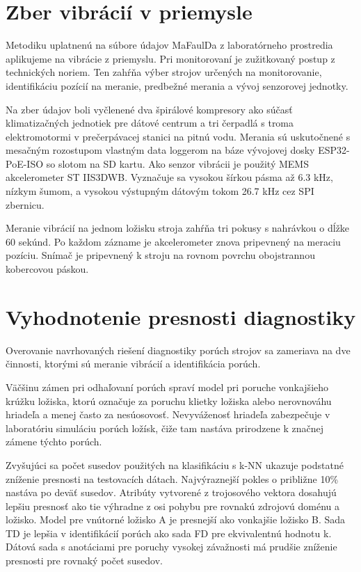 \section{Zber vibrácií v priemysle}
Metodiku uplatnenú na súbore údajov MaFaulDa z laboratórneho prostredia aplikujeme na vibrácie z priemyslu. Pri monitorovaní je zužitkovaný postup z technických noriem. Ten zahŕňa výber strojov určených na monitorovanie, identifikáciu pozícií na meranie, predbežné merania a vývoj senzorovej jednotky. 

Na zber údajov boli vyčlenené dva špirálové kompresory ako súčasť klimatizačných jednotiek pre dátové centrum a tri čerpadlá s troma elektromotormi v prečerpávacej stanici na pitnú vodu. Merania sú uskutočnené s mesačným rozostupom vlastným data loggerom na báze vývojovej dosky ESP32-PoE-ISO so slotom na SD kartu. Ako senzor vibrácii je použitý MEMS akcelerometer ST IIS3DWB. Vyznačuje sa vysokou šírkou pásma až 6.3 kHz, nízkym šumom, a vysokou výstupným dátovým tokom 26.7 kHz cez SPI zbernicu. 

Meranie vibrácií na jednom ložisku stroja zahŕňa tri pokusy s nahrávkou o dĺžke 60 sekúnd. Po každom zázname je akcelerometer znova pripevnený na meraciu pozíciu. Snímač je pripevnený k stroju na rovnom povrchu obojstrannou kobercovou páskou.

\section{Vyhodnotenie presnosti diagnostiky}
Overovanie navrhovaných riešení diagnostiky porúch strojov sa zameriava na dve činnosti, ktorými sú meranie vibrácií a identifikácia porúch.

Väčšinu zámen pri odhaľovaní porúch spraví model pri poruche vonkajšieho krúžku ložiska, ktorú označuje za poruchu klietky ložiska alebo nerovnováhu hriadeľa a menej často za nesúosovosť. Nevyváženosť hriadeľa zabezpečuje v laboratóriu simuláciu porúch ložísk, čiže tam nastáva prirodzene k značnej zámene týchto porúch.

Zvyšujúci sa počet susedov použitých na klasifikáciu s k-NN ukazuje podstatné zníženie presnosti na testovacích dátach. Najvýraznejší pokles o približne 10\% nastáva po deväť susedov. Atribúty vytvorené z trojosového vektora dosahujú lepšiu presnosť ako tie výhradne z osi pohybu pre rovnakú zdrojovú doménu a ložisko. Model pre vnútorné ložisko A je presnejší ako vonkajšie ložisko B. Sada TD je lepšia v identifikácií porúch ako sada FD pre ekvivalentnú hodnotu k. Dátová sada s anotáciami pre poruchy vysokej závažnosti má prudšie zníženie presnosti pre rovnaký počet susedov.

